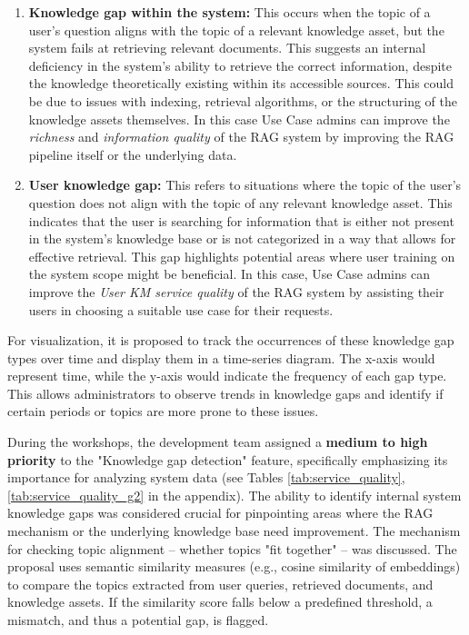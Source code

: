 \documentclass[
	english,
	ruledheaders=section,%
	class=report,%
	thesis={type=bachelor},%
	accentcolor=1b,%
	custommargins=true,%
	marginpar=false,%
	parskip=half-,%
	fontsize=11pt,%
	DIV=14,
]{tudapub}
\begin{document}
\begin{enumerate}
    \item \textbf{Knowledge gap within the system:} This occurs when the topic of a user's question aligns with the topic of a relevant knowledge asset, but the system fails at retrieving relevant documents. This suggests an internal deficiency in the system's ability to retrieve the correct information, despite the knowledge theoretically existing within its accessible sources. This could be due to issues with indexing, retrieval algorithms, or the structuring of the knowledge assets themselves. In this case Use Case admins can improve the \textit{richness} and \textit{information quality} \parencite[pp.~57--58]{Jennex2006} of the RAG system by improving the RAG pipeline itself or the underlying data.
    \item \textbf{User knowledge gap:} This refers to situations where the topic of the user's question does not align with the topic of any relevant knowledge asset. This indicates that the user is searching for information that is either not present in the system's knowledge base or is not categorized in a way that allows for effective retrieval. This gap highlights potential areas where user training on the system scope might be beneficial. In this case, Use Case admins can improve the \textit{User KM service quality} \parencite[pp.~58--59]{Jennex2006} of the RAG system by assisting their users in choosing a suitable use case for their requests.
\end{enumerate}

For visualization, it is proposed to track the occurrences of these knowledge gap types over time and display them in a time-series diagram. The x-axis would represent time, while the y-axis would indicate the frequency of each gap type. This allows administrators to observe trends in knowledge gaps and identify if certain periods or topics are more prone to these issues.

During the workshops, the development team assigned a \textbf{medium to high priority} to the "Knowledge gap detection" feature, specifically emphasizing its importance for analyzing system data (see Tables \ref{tab:service_quality}, \ref{tab:service_quality_g2} in the appendix). The ability to identify internal system knowledge gaps was considered crucial for pinpointing areas where the RAG mechanism or the underlying knowledge base need improvement. The mechanism for checking topic alignment -- whether topics "fit together" -- was discussed. The proposal uses semantic similarity measures (e.g., cosine similarity of embeddings) to compare the topics extracted from user queries, retrieved documents, and knowledge assets. If the similarity score falls below a predefined threshold, a mismatch, and thus a potential gap, is flagged.
\end{document}
